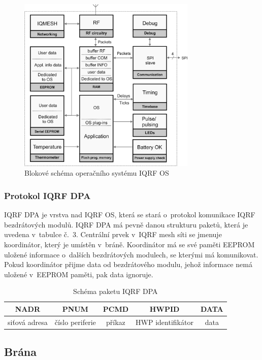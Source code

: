 \documentclass[12pt,a4paper,oneside]{article}
\begin{document}
\begin{figure}[H]
\centering
\label{fig:foto/iqrf-os}
\includegraphics[width = 85mm]{../img/iqrf/os-blokove-schema.png}
\caption{Blokové schéma operačního systému IQRF OS}
\end{figure}

\newpage

\subsubsection{Protokol IQRF DPA}

IQRF DPA\cite{iqrf/dpa} je vrstva nad IQRF OS, která se stará o~protokol komunikace IQRF bezdrátových modulů. IQRF DPA má pevně danou strukturu paketů, která je uvedena v~tabulce č.~3. Centrální prvek v~IQRF mesh síti se jmenuje koordinátor, který je umístěn v~bráně. Koordinátor má se své paměti EEPROM uložené informace o~dalších bezdrátových modulech, se kterými má komunikovat. Pokud koordinátor přijme data od bezdrátového modulu, jehož informace nemá uložené v~EEPROM paměti, pak data ignoruje.

\begin{table}[H]
\centering
\begin{tabular}{|c|c|c|c|c|}
\hline
NADR & PNUM & PCMD & HWPID & DATA \\
\hline
siťová adresa & číslo periferie & příkaz & HWP\index[zkr]{HWP!Hardware profile|textit} identifikátor & data \\
\hline
\end{tabular}
\caption{Schéma paketu IQRF DPA}\label{table:iqrf/dpa}
\end{table}

\newpage

\subsection{Brána}
\end{document}
